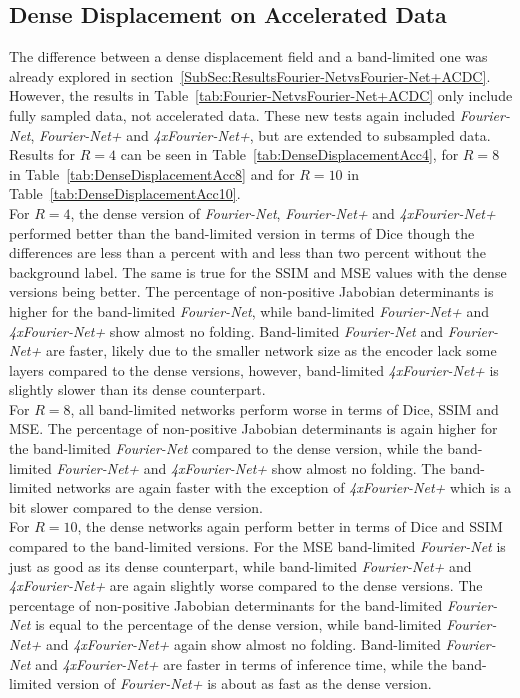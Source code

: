 \documentclass[english,version-2022-01]{uzl-thesis} %
\begin{document}
\subsection{Dense Displacement on Accelerated Data} \label{SubSec:DenseDisplacementAcc}
The difference between a dense displacement field and a band-limited one was already explored in section~\ref{SubSec:ResultsFourier-NetvsFourier-Net+ACDC}. However, the results in Table~\ref{tab:Fourier-NetvsFourier-Net+ACDC} only include fully sampled data, not accelerated data. These new tests again included \emph{Fourier-Net}, \emph{Fourier-Net+} and \emph{4xFourier-Net+}, but are extended to subsampled data. Results for $R=4$ can be seen in Table~\ref{tab:DenseDisplacementAcc4}, for $R=8$ in Table~\ref{tab:DenseDisplacementAcc8} and for $R=10$ in Table~\ref{tab:DenseDisplacementAcc10}. \\
For $R=4$, the dense version of \emph{Fourier-Net}, \emph{Fourier-Net+} and \emph{4xFourier-Net+} performed better than the band-limited version in terms of Dice though the differences are less than a percent with and less than two percent without the background label. The same is true for the SSIM and MSE values with the dense versions being better. The percentage of non-positive Jabobian determinants is higher for the band-limited \emph{Fourier-Net}, while band-limited \emph{Fourier-Net+} and \emph{4xFourier-Net+} show almost no folding. 
Band-limited \emph{Fourier-Net} and \emph{Fourier-Net+} are faster, likely due to the smaller network size as the encoder lack some layers compared to the dense versions, however, band-limited \emph{4xFourier-Net+} is slightly slower than its dense counterpart.\\
For $R=8$, all band-limited networks perform worse in terms of Dice, SSIM and MSE. The percentage of non-positive Jabobian determinants is again higher for the band-limited \emph{Fourier-Net} compared to the dense version, while the band-limited \emph{Fourier-Net+} and \emph{4xFourier-Net+} show almost no folding. The band-limited networks are again faster with the exception of \emph{4xFourier-Net+} which is a bit slower compared to the dense version. \\
For $R=10$, the dense networks again perform better in terms of Dice and SSIM compared to the band-limited versions. For the MSE band-limited \emph{Fourier-Net} is just as good as its dense counterpart, while band-limited \emph{Fourier-Net+} and \emph{4xFourier-Net+} are again slightly worse compared to the dense versions. The percentage of non-positive Jabobian determinants for the band-limited \emph{Fourier-Net} is equal to the percentage of the dense version, while band-limited \emph{Fourier-Net+} and \emph{4xFourier-Net+} again show almost no folding. Band-limited \emph{Fourier-Net} and \emph{4xFourier-Net+} are faster in terms of inference time, while the band-limited version of \emph{Fourier-Net+} is about as fast as the dense version.
\end{document}
